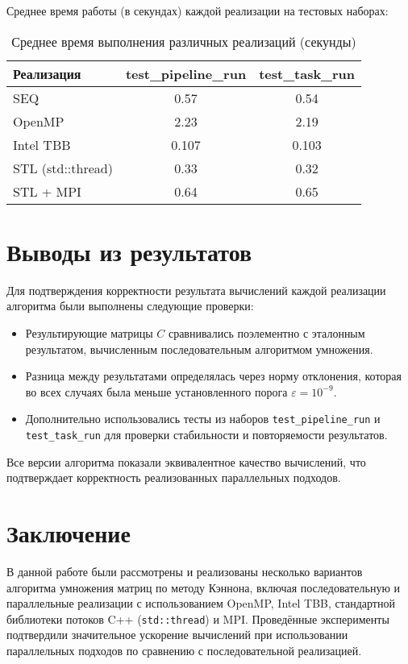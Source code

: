 \documentclass[12pt]{article}
\begin{document}
Среднее время работы (в секундах) каждой реализации на тестовых наборах:

\begin{table}[H]
\centering
\begin{tabular}{|l|c|c|}
\hline
\textbf{Реализация} & \textbf{test\_pipeline\_run} & \textbf{test\_task\_run} \\
\hline
SEQ & 0.57 & 0.54\\
OpenMP & 2.23 &  2.19\\
Intel TBB & 0.107 &0.103 \\
STL (std::thread) & 0.33& 0.32 \\
STL + MPI &  0.64&  0.65\\
\hline
\end{tabular}
\caption{Среднее время выполнения различных реализаций (секунды)}
\end{table}

\newpage
\section*{Выводы из результатов}

Для подтверждения корректности результата вычислений каждой реализации алгоритма были выполнены следующие проверки:

\begin{itemize}
    \item Результирующие матрицы \(C\) сравнивались поэлементно с эталонным результатом, вычисленным последовательным алгоритмом умножения.
    \item Разница между результатами определялась через норму отклонения, которая во всех случаях была меньше установленного порога \(\varepsilon = 10^{-9}\).
    \item Дополнительно использовались тесты из наборов \texttt{test\_pipeline\_run} и \texttt{test\_task\_run} для проверки стабильности и повторяемости результатов.
\end{itemize}

Все версии алгоритма показали эквивалентное качество вычислений, что подтверждает корректность реализованных параллельных подходов.

\newpage
\section*{Заключение}

В данной работе были рассмотрены и реализованы несколько вариантов алгоритма умножения матриц по методу Кэннона, включая последовательную и параллельные реализации с использованием OpenMP, Intel TBB, стандартной библиотеки потоков C++ (\texttt{std::thread}) и MPI. Проведённые эксперименты подтвердили значительное ускорение вычислений при использовании параллельных подходов по сравнению с последовательной реализацией.
\end{document}
